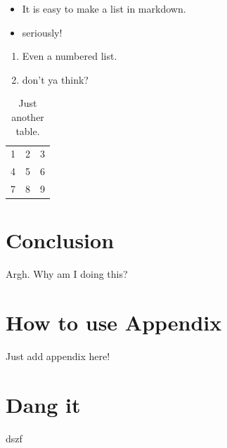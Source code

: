 \documentclass[oneside,phd,]{snuthesis}
\providecommand{\tightlist}{%
  \setlength{\itemsep}{0pt}\setlength{\parskip}{0pt}}
\begin{document}
\begin{itemize}
\tightlist
\item
  It is easy to make a list in markdown.
\item
  seriously!
\end{itemize}

\begin{enumerate}
\def\labelenumi{\arabic{enumi}.}
\tightlist
\item
  Even a numbered list.
\item
  don't ya think?
\end{enumerate}

\begin{table}
\caption{Just another table.}
\begin{center}
\begin{tabular}{ l | c | r }
  1 & 2 & 3 \\
  4 & 5 & 6 \\
  7 & 8 & 9 \\
\end{tabular}
\end{center}
\end{table}

\chapter{Conclusion}\label{conclusion}

Argh. Why am I doing this? \citet{Nesterov:DoklAkadNaukSssr:1983}
\citep{Boyd:ConvexOptimization:2004}
\citet{Bertsekas:ConvexOptimizationTheory:2009}




\appendix

\chapter{How to use Appendix}\label{how-to-use-appendix}

Just add appendix here!

\chapter{Dang it}\label{dang-it}

dszf







\begin{abstractalt}

\end{abstractalt}

\acknowledgement

\end{document}
